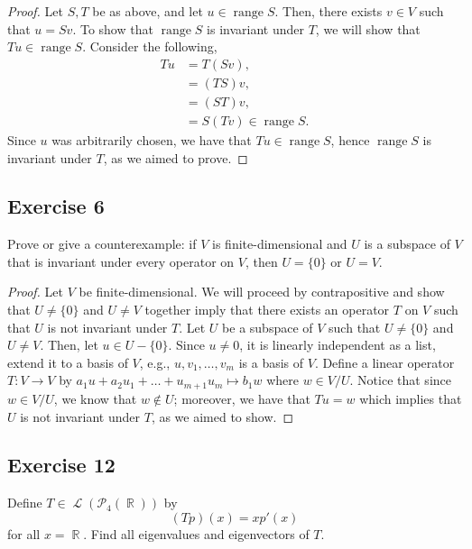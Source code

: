 \documentclass[letterpaper, 12pt]{amsart}
\DeclareMathOperator{\R}{\mathbb{R}}				%
\DeclareMathOperator{\Ell}{\mathscr{L}}				%
\DeclareMathOperator{\range}{\text{range }}			%
\theoremstyle{definition}  							%
\begin{document}
		\begin{proof}
		Let $S,T$ be as above, and let $u \in \range S$.
		Then, there exists $v \in V$ such that $u = Sv$.
		To show that $\range S$ is invariant under $T$, we will show that $Tu \in \range S$.
		Consider the following,
			\begin{align*}
				Tu &= T(Sv), \\
				&= (TS)v, \\
				&= (ST)v, \\
				&= S(Tv) \in \range S.
			\end{align*}
		Since $u$ was arbitrarily chosen, we have that $Tu \in \range S$, hence $\range S$ is invariant under $T$, as we aimed to prove.
			
		\end{proof}

		\subsection*{Exercise 6}
		Prove or give a counterexample: if $V$ is finite-dimensional and $U$ is a subspace of $V$ that is invariant under every operator on $V$, then $U = \{ 0 \}$ or $U = V$.

		\begin{proof}
		Let $V$ be finite-dimensional. 
		We will proceed by contrapositive and show that $U \neq \{0\}$ and $U \neq V$ together imply that there exists an operator $T$ on $V$ such that $U$ is not invariant under $T$.
		Let $U$ be a subspace of $V$ such that $U \neq \{0\}$ and $U \neq V$.
		Then, let $u \in U - \{0\}$.
		Since $u \neq 0$, it is linearly independent as a list, extend it to a basis of $V$, e.g., $u, v_{1}, \dots, v_{m}$ is a basis of $V$.
		Define a linear operator $T : V \to V$ by $a_{1}u + a_{2}u_{1} + \dots + u_{m+1}u_{m} \mapsto b_{1}w$ where $w \in V/U$.
		Notice that since $w \in V/U$, we know that $w \notin U$; moreover, we have that $Tu = w$ which implies that $U$ is not invariant under $T$, as we aimed to show.
		\end{proof}

		\subsection*{Exercise 12}
		Define $T \in \Ell\left( \mathcal{P}_{4}(\R) \right)$ by $$(Tp)(x) = xp'(x)$$ for all $x = \R$. 
		Find all eigenvalues and eigenvectors of $T$.
\end{document}
